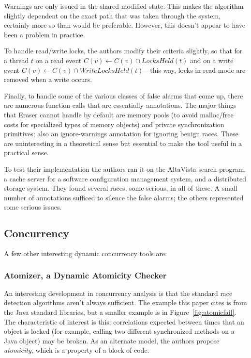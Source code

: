 \documentclass{article}
\begin{document}
\begin{multicols}{2}
Warnings are only issued in the shared-modified state.  This makes the
algorithm slightly dependent on the exact path that was taken through
the system, certainly more so than would be preferable.  However, this
doesn't appear to have been a problem in practice.

To handle read/write locks, the authors modify their criteria
slightly, so that for a thread $t$ on a read event $C(v) \leftarrow
C(v) \cap LocksHeld (t)$ and on a write event $C(v) \leftarrow C(v)
\cap WriteLocksHeld (t)$---this way, locks in read mode are removed
when a write occurs.

Finally, to handle some of the various classes of false alarms that
come up, there are numerous function calls that are essentially
annotations.  The major things that Eraser cannot handle by default
are memory pools (to avoid malloc/free costs for specialized types of
memory objects) and private synchronization primitives; also an
ignore-warnings annotation for ignoring benign races.  These are
uninteresting in a theoretical sense but essential to make the tool
useful in a practical sense.

To test their implementation the authors ran it on the AltaVista
search program, a cache server for a software configuration management
system, and a distributed storage system.  They found several races,
some serious, in all of these.  A small number of annotations sufficed
to silence the false alarms; the others represented some serious
issues.

\subsection{Concurrency}

A few other interesting dynamic concurrency tools are:

\subsubsection{Atomizer, a Dynamic Atomicity Checker~\cite{964023}}

An interesting development in concurrency analysis is that the
standard race detection algorithms aren't always sufficient.  The
example this paper cites is from the Java standard libraries, but a
smaller example is in Figure~\ref{fig:atomicfail}.  The characteristic
of interest is this: correlations expected between times that an
object is locked (for example, calling two different synchronized
methods on a Java object) may be broken.  As an alternate model, the
authors propose \textit{atomicity}, which is a property of a block of
code.


\end{multicols}
\end{document}
